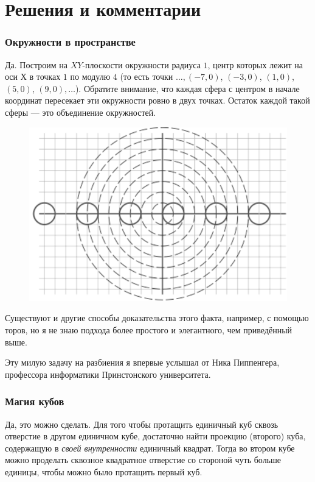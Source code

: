 \section*{Решения и комментарии}

\subsubsection*{Окружности в пространстве}%

Да.
Построим на $XY$-плоскости окружности радиуса $1$, центр которых лежит на оси $Х$ в точках $1$ по модулю $4$ (то есть точки $\dots, (-7,0)$, $(-3,0)$, $(1,0)$, $(5,0)$, $(9,0),\dots$).
Обратите внимание, что каждая сфера с центром в начале координат пересекает эти окружности ровно в двух точках.
Остаток каждой такой сферы --- это объединение окружностей.
\heart

\begin{figure}[h!]
\centering
\includegraphics[scale=0.7]{Figs/Geometry/ring}
\end{figure} 

Существуют и другие способы доказательства этого факта, например, с помощью торов, но я не знаю подхода более простого и элегантного, чем приведённый выше.

Эту милую задачу на разбиения я впервые услышал от Ника Пиппенгера, %
профессора информатики Принстонского университета.

\subsubsection*{Магия кубов}%

Да, это можно сделать.
Для того чтобы протащить единичный куб сквозь отверстие в другом единичном кубе, достаточно найти проекцию (второго) куба, содержащую в \emph{своей внутренности} единичный квадрат.
Тогда во втором кубе можно проделать сквозное квадратное отверстие %
со стороной чуть больше единицы, чтобы можно было протащить первый куб.

